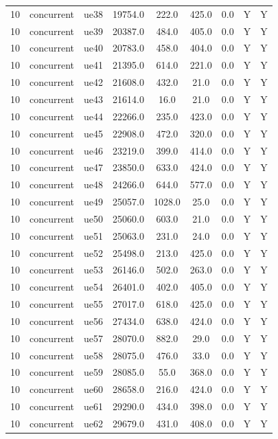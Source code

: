 \begin{table}[ht]
\begin{tabular}{|c|c|c|c|c|c|c|c|c|}
10 & concurrent & ue38 & 19754.0 & 222.0 & 425.0 & 0.0 & Y & Y \\
10 & concurrent & ue39 & 20387.0 & 484.0 & 405.0 & 0.0 & Y & Y \\
10 & concurrent & ue40 & 20783.0 & 458.0 & 404.0 & 0.0 & Y & Y \\
10 & concurrent & ue41 & 21395.0 & 614.0 & 221.0 & 0.0 & Y & Y \\
10 & concurrent & ue42 & 21608.0 & 432.0 & 21.0 & 0.0 & Y & Y \\
10 & concurrent & ue43 & 21614.0 & 16.0 & 21.0 & 0.0 & Y & Y \\
10 & concurrent & ue44 & 22266.0 & 235.0 & 423.0 & 0.0 & Y & Y \\
10 & concurrent & ue45 & 22908.0 & 472.0 & 320.0 & 0.0 & Y & Y \\
10 & concurrent & ue46 & 23219.0 & 399.0 & 414.0 & 0.0 & Y & Y \\
10 & concurrent & ue47 & 23850.0 & 633.0 & 424.0 & 0.0 & Y & Y \\
10 & concurrent & ue48 & 24266.0 & 644.0 & 577.0 & 0.0 & Y & Y \\
10 & concurrent & ue49 & 25057.0 & 1028.0 & 25.0 & 0.0 & Y & Y \\
10 & concurrent & ue50 & 25060.0 & 603.0 & 21.0 & 0.0 & Y & Y \\
10 & concurrent & ue51 & 25063.0 & 231.0 & 24.0 & 0.0 & Y & Y \\
10 & concurrent & ue52 & 25498.0 & 213.0 & 425.0 & 0.0 & Y & Y \\
10 & concurrent & ue53 & 26146.0 & 502.0 & 263.0 & 0.0 & Y & Y \\
10 & concurrent & ue54 & 26401.0 & 402.0 & 405.0 & 0.0 & Y & Y \\
10 & concurrent & ue55 & 27017.0 & 618.0 & 425.0 & 0.0 & Y & Y \\
10 & concurrent & ue56 & 27434.0 & 638.0 & 424.0 & 0.0 & Y & Y \\
10 & concurrent & ue57 & 28070.0 & 882.0 & 29.0 & 0.0 & Y & Y \\
10 & concurrent & ue58 & 28075.0 & 476.0 & 33.0 & 0.0 & Y & Y \\
10 & concurrent & ue59 & 28085.0 & 55.0 & 368.0 & 0.0 & Y & Y \\
10 & concurrent & ue60 & 28658.0 & 216.0 & 424.0 & 0.0 & Y & Y \\
10 & concurrent & ue61 & 29290.0 & 434.0 & 398.0 & 0.0 & Y & Y \\
10 & concurrent & ue62 & 29679.0 & 431.0 & 408.0 & 0.0 & Y & Y \\

\end{tabular}
\end{table}
